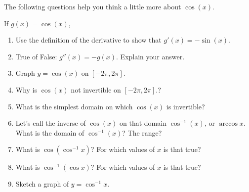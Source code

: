 \documentclass[12pt,twoside]{article}
\begin{document}
The following questions help you think a little more about $\cos(x)$. 

If $g(x) = \cos(x)$, 
\begin{enumerate}
      \item Use the definition of the derivative to show that $g'(x) = -\sin(x)$. 
      \item True of False: $g''(x) = -g(x)$. Explain your answer. 
      \item Graph $y = \cos(x)$ on $[-2\pi, 2\pi]$. 
      \item Why is $\cos(x)$ not invertible on $[-2\pi, 2\pi]$.?
      \item What is the simplest domain on which $\cos(x)$ is invertible?
      \item Let's call the inverse of $\cos(x)$ on that domain $\cos^{-1}(x)$, or $\arccos x$. What is the domain of $\cos^{-1}(x)$? The range?
      \item What is $\cos(\cos^{-1} x)$? For which values of $x$ is that true?
      \item What is $\cos^{-1} (\cos x)$? For which values of $x$ is that true?
      \item Sketch a graph of $y = \cos^{-1} x$. 
\end{enumerate}
\end{document}
